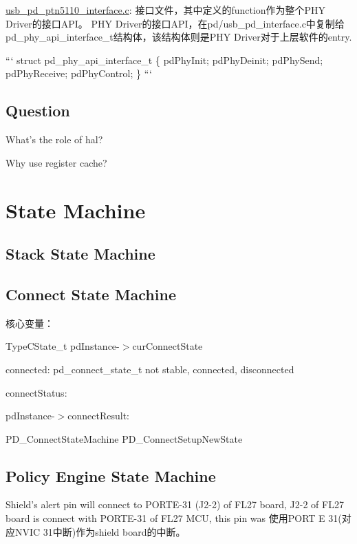 \hyperlink{usb__pd__ptn5110__interface_8c}{usb\-\_\-pd\-\_\-ptn5110\-\_\-interface.\-c}\-: 接口文件，其中定义的function作为整个\-P\-H\-Y Driver的接口\-A\-P\-I。 P\-H\-Y Driver的接口\-A\-P\-I，在pd/usb\-\_\-pd\-\_\-interface.c中复制给pd\-\_\-phy\-\_\-api\-\_\-interface\-\_\-t结构体，该结构体则是\-P\-H\-Y Driver对于上层软件的entry.

``` struct pd\-\_\-phy\-\_\-api\-\_\-interface\-\_\-t \{ pd\-Phy\-Init; pd\-Phy\-Deinit; pd\-Phy\-Send; pd\-Phy\-Receive; pd\-Phy\-Control; \} ```

\subsection*{Question}


\begin{DoxyItemize}
\item What's the role of hal?
\item Why use register cache?
\end{DoxyItemize}

\section*{State Machine}

\subsection*{Stack State Machine}

\subsection*{Connect State Machine}

核心变量：
\begin{DoxyItemize}
\item Type\-C\-State\-\_\-t pd\-Instance-\/$>$cur\-Connect\-State
\item connected\-: pd\-\_\-connect\-\_\-state\-\_\-t not stable, connected, disconnected
\item connect\-Status\-:
\item pd\-Instance-\/$>$connect\-Result\-:
\end{DoxyItemize}

P\-D\-\_\-\-Connect\-State\-Machine P\-D\-\_\-\-Connect\-Setup\-New\-State

\subsection*{Policy Engine State Machine}

Shield's alert pin will connect to P\-O\-R\-T\-E-\/31 (J2-\/2) of F\-L27 board, J2-\/2 of F\-L27 board is connect with P\-O\-R\-T\-E-\/31 of F\-L27 M\-C\-U, this pin was 使用\-P\-O\-R\-T E 31(对应\-N\-V\-I\-C 31中断)作为shield board的中断。 